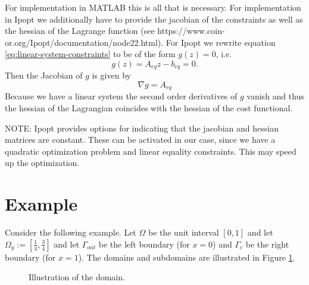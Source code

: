 \documentclass[
12pt, %
a4paper, %
onecolumn, %
portrait %
]{article}
\begin{document}
For implementation in MATLAB this is all that is necessary. For implementation in Ipopt we additionally have to provide the jacobian of the constraints as well as the hessian of the Lagrange function (see https://www.coin-or.org/Ipopt/documentation/node22.html).
For Ipopt we rewrite equation \eqref{eq:linear-system-constraints} to be of the form $g(z) = 0$, i.e.
\begin{equation}
g(z) = A_{eq} z - b_{eq} = 0.
\end{equation}
Then the Jacobian of $g$ is given by
\begin{equation}
\nabla g = A_{eq}
\end{equation}
Because we have a linear system the second order derivatives of $g$ vanish and thus the hessian of the Lagrangian coincides with the hessian of the cost functional.

NOTE: Ipopt provides options for indicating that the jacobian and hessian matrices are constant. These can be activated in our case, since we have a quadratic optimization problem and linear equality constraints. This may speed up the optimization.

\section{Example}
Consider the following example. Let $\Omega$ be the unit interval $[0,1]$ and let $\Omega_y := [\frac{1}{4},\frac{3}{4}]$ and let $\Gamma_{out}$ be the left boundary (for $x=0$) and $\Gamma_c$ be the right boundary (for $x=1$). The domains and subdomains are illustrated in Figure \ref{fig:domain}.
\begin{figure}[h]
\begin{center}
\end{center}
\caption{Illustration of the domain.}
\label{fig:domain}
\end{figure}
\end{document}
